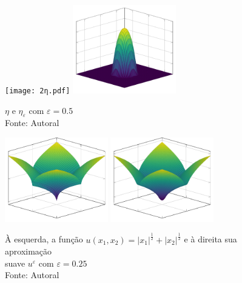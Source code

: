\documentclass[a4paper, 11pt]{book}
\theoremstyle{definition}
\begin{document}
\begin{ex}
    \begin{figure}
        \centering
        \texttt{[image: 2η.pdf]}
        \hspace{10mm}
        \includegraphics[width=0.4\textwidth]{2ηε.pdf}
        \caption{$\eta$ e $\eta_\varepsilon$ com $\varepsilon = 0.5$\\Fonte: Autoral}
        \label{fig:eta-R2}
    \end{figure}

    \begin{figure}
        \centering
        \includegraphics[width=0.4\textwidth]{u.pdf}
        \hspace{10mm}
        \includegraphics[width=0.4\textwidth]{uε2.pdf}
        \caption{À esquerda, a função $u(x_1,x_2) = |x_1|^{\frac{1}{2}} + |x_2|^{\frac{1}{2}}$ e à direita sua aproximação\\suave $u^\varepsilon$ com $\varepsilon = 0.25$\\Fonte: Autoral}
        \label{fig:aproximacao-suave-R2}
    \end{figure}
\end{ex}
\end{document}
